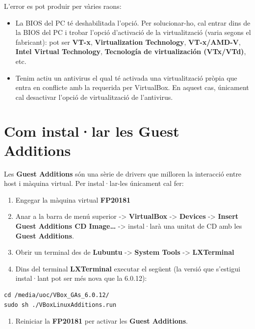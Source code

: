 \documentclass[
]{book}
\providecommand{\tightlist}{%
  \setlength{\itemsep}{0pt}\setlength{\parskip}{0pt}}
\begin{document}
L'error es pot produir per vàries raons:

\begin{itemize}
\tightlist
\item
  La BIOS del PC té deshabilitada l'opció. Per solucionar-ho, cal entrar dins de la BIOS del PC i trobar l'opció d'activació de la virtualització (varia segons el fabricant): pot ser \textbf{VT-x}, \textbf{Virtualization Technology}, \textbf{VT-x/AMD-V}, \textbf{Intel Virtual Technology}, \textbf{Tecnología de virtualización (VTx/VTd)}, etc.
\item
  Tenim actiu un antivirus el qual té activada una virtualització pròpia que entra en conflicte amb la requerida per VirtualBox. En aquest cas, únicament cal desactivar l'opció de virtualització de l'antivirus.
\end{itemize}

\hypertarget{com-installar-les-guest-additions}{%
\section{Com instal·lar les Guest Additions}\label{com-installar-les-guest-additions}}

Les \textbf{Guest Additions} són una sèrie de drivers que milloren la interacció entre host i màquina virtual. Per instal·lar-les únicament cal fer:

\begin{enumerate}
\def\labelenumi{\arabic{enumi}.}
\tightlist
\item
  Engegar la màquina virtual \textbf{FP20181}
\item
  Anar a la barra de menú superior -\textgreater{} \textbf{VirtualBox} -\textgreater{} \textbf{Devices} -\textgreater{} \textbf{Insert Guest Additions CD Image\ldots{}} -\textgreater{} instal·larà una unitat de CD amb les \textbf{Guest Additions}.
\item
  Obrir un terminal des de \textbf{Lubuntu} -\textgreater{} \textbf{System Tools} -\textgreater{} \textbf{LXTerminal}
\item
  Dins del terminal \textbf{LXTerminal} executar el següent (la versió que s'estigui instal·lant pot ser més nova que la 6.0.12):
\end{enumerate}

\begin{verbatim}
cd /media/uoc/VBox_GAs_6.0.12/     
sudo sh ./VBoxLinuxAdditions.run
\end{verbatim}

\begin{enumerate}
\def\labelenumi{\arabic{enumi}.}
\tightlist
\item
  Reiniciar la \textbf{FP20181} per activar les \textbf{Guest Additions}.
\end{enumerate}
\end{document}
